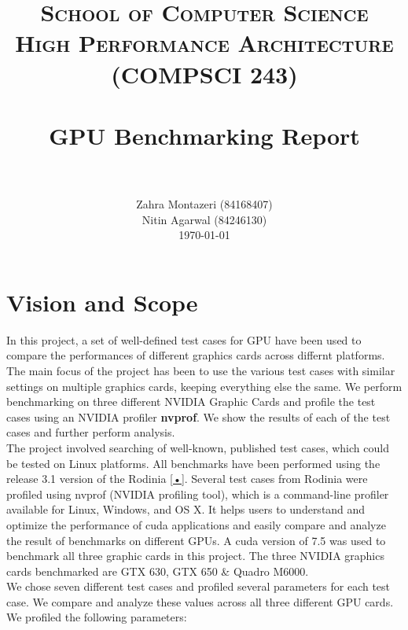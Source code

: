 \documentclass[paper=a4, fontsize=11pt]{scrartcl}
\title{
		\usefont{OT1}{bch}{b}{n}
		\normalfont \normalsize \textsc{School of Computer Science} \\ 
        \normalsize \textsc{High Performance Architecture (COMPSCI 243)} \\
        [25pt]
		\horrule{0.5pt} \\[0.4cm]
		\huge GPU Benchmarking Report \\
		\horrule{2pt} \\[0.5cm]
}
\author{
		\normalfont 								
        \normalsize
        Zahra Montazeri (84168407) \\[-3pt]		
        \normalsize 
        \newline
        \normalsize
        Nitin Agarwal (84246130) \\[-3pt]		
        \normalsize 
        \newline
        \newline
        \today
}
\date{}
\numberwithin{equation}{section}		%
\numberwithin{figure}{section}			%
\numberwithin{table}{section}				%
\begin{document}
\maketitle
\newpage
\tableofcontents
\newpage
\section{Vision and Scope}
In this project, a set of well-defined test cases for GPU have been used to compare the performances of different graphics cards across differnt platforms. The main focus of the project has been to use the various test cases with similar settings on multiple graphics cards, keeping everything else the same. We perform benchmarking on three different NVIDIA Graphic Cards and profile the test cases using an NVIDIA profiler \textbf{nvprof}. We show the results of each of the test cases and further perform analysis.\\

The project involved searching of well-known, published test cases, which could be tested on Linux platforms. All benchmarks have been performed using the release 3.1 version of the Rodinia \ref{•}. Several test cases from Rodinia were profiled using nvprof (NVIDIA profiling tool), which is a command-line profiler available for Linux, Windows, and OS X. It helps users to understand and optimize the performance of cuda applications and easily compare and analyze the result of benchmarks on different GPUs. A cuda version of 7.5 was used to benchmark all three graphic cards in this project. The three NVIDIA graphics cards benchmarked are GTX 630, GTX 650 \& Quadro M6000.\\

We chose seven different test cases and profiled several parameters for each test case. We compare and analyze these values across all three different GPU cards. We profiled the following parameters:
\end{document}
